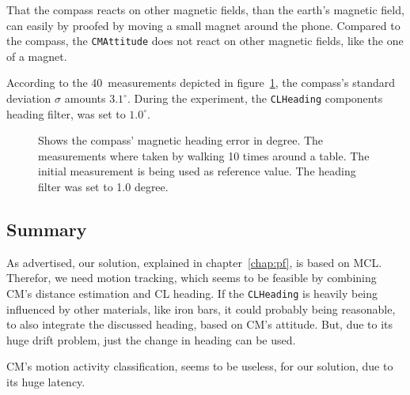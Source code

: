 That the compass reacts on other magnetic fields, than the earth's magnetic field, can easily by proofed by moving a small magnet around the phone. Compared to the compass, the \texttt{CMAttitude} does not react on other magnetic fields, like the one of a magnet.

According to the 40~measurements depicted in figure~\ref{fig:eval:compass}, the compass's standard deviation $\sigma$ amounts $3.1^{\circ}$. During the experiment, the \texttt{CLHeading} components heading filter, was set to $1.0^{\circ}$.

\begin{figure}[htbp]
	
	\caption{Shows the compass' magnetic heading error in degree. The measurements where taken by walking 10 times around a table. The initial measurement is being used as reference value. The heading filter was set to 1.0 degree.}
	\label{fig:eval:compass}
\end{figure}

\subsection{Summary}
As advertised, our solution, explained in chapter~\ref{chap:pf}, is based on \ac{MCL}. Therefor, we need motion tracking, which seems to be feasible by combining \ac{CM}'s distance estimation and \ac{CL} heading. If the \texttt{CLHeading} is heavily being influenced by other materials, like iron bars, it could probably being reasonable, to also integrate the discussed heading, based on \ac{CM}'s attitude. But, due to its huge drift problem, just the change in heading can be used.

\ac{CM}'s motion activity classification, seems to be useless, for our solution, due to its huge latency.